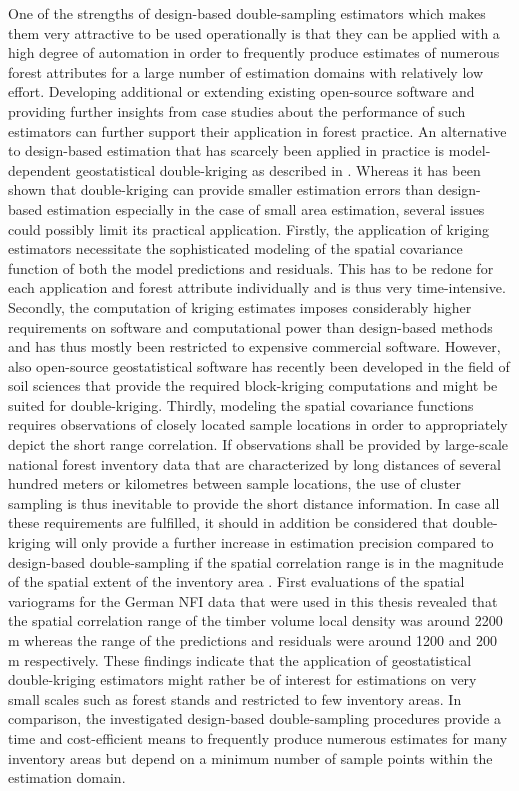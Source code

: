 One of the strengths of design-based double-sampling estimators which makes them very attractive to be used operationally is that they can be applied with a high degree of automation in order to frequently produce estimates of numerous forest attributes for a large number of estimation domains with relatively low effort. Developing additional or extending existing open-source software and providing further insights from case studies about the performance of such estimators can further support their application in forest practice. An alternative to design-based estimation that has scarcely been applied in practice is model-dependent geostatistical double-kriging as described in \citet{mandallaz1993}. Whereas it has been shown that double-kriging can provide smaller estimation errors than design-based estimation especially in the case of small area estimation, several issues could possibly limit its practical application. Firstly, the application of kriging estimators necessitate the sophisticated modeling of the spatial covariance function of both the model predictions and residuals. This has to be redone for each application and forest attribute individually and is thus very time-intensive. Secondly, the computation of kriging estimates imposes considerably higher requirements on software and computational power than design-based methods and has thus mostly been restricted to expensive commercial software. However, also open-source geostatistical software has recently been developed in the field of soil sciences \citep{georob2018} that provide the required block-kriging computations and might be suited for double-kriging. Thirdly, modeling the spatial covariance functions requires observations of closely located sample locations in order to appropriately depict the short range correlation. If observations shall be provided by large-scale national forest inventory data that are characterized by long distances of several hundred meters or kilometres between sample locations, the use of cluster sampling is thus inevitable to provide the short distance information. In case all these requirements are fulfilled, it should in addition be considered that double-kriging will only provide a further increase in estimation precision compared to design-based double-sampling if the spatial correlation range is in the magnitude of the spatial extent of the inventory area \citep{mandallaz1993}. First evaluations of the spatial variograms for the German NFI data that were used in this thesis revealed that the spatial correlation range of the timber volume local density was around 2200 m whereas the range of the predictions and residuals were around 1200 and 200 m respectively. These findings indicate that the application of geostatistical double-kriging estimators might rather be of interest for estimations on very small scales such as forest stands and restricted to few inventory areas. In comparison, the investigated design-based double-sampling procedures provide a time and cost-efficient means to frequently produce numerous estimates for many inventory areas but depend on a minimum number of sample points within the estimation domain.



